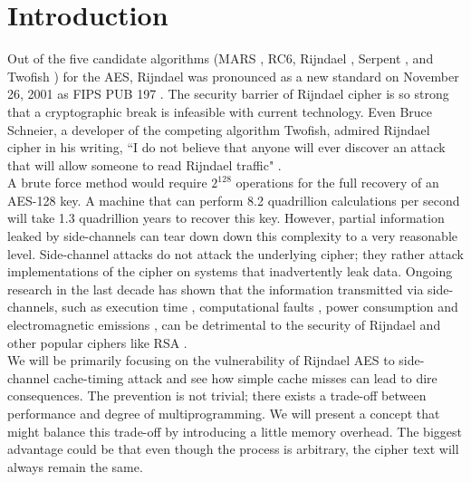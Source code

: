 \section{Introduction}

Out of the five candidate algorithms (MARS \cite{mars1998proposal}, RC6, Rijndael \cite{rijndael1998proposal}, Serpent \cite{serpent1998proposal}, and Twofish \cite{twofish1998proposal}) for the AES, Rijndael was pronounced as a new standard on November 26, 2001 as FIPS PUB 197 \cite{fips}. The security barrier of Rijndael cipher is so strong that a cryptographic break is infeasible with current technology. Even Bruce Schneier, a developer of the competing algorithm Twofish, admired Rijndael cipher in his writing, ``I do not believe that anyone will ever discover an attack that will allow someone to read Rijndael traffic" \cite{admire}.\\

A brute force method would require $2^{128}$ operations for the full recovery of an AES-128 key. A machine that can perform 8.2 quadrillion calculations per second will take 1.3 quadrillion years to recover this key. However, partial information leaked by side-channels can tear down down this complexity to a very reasonable level. Side-channel attacks do not attack the underlying cipher; they rather attack implementations of the cipher on systems that inadvertently leak data. Ongoing research in the last decade has shown that the information transmitted via side-channels, such as execution time \cite{spadavecchia2006network}, computational faults \cite{boneh}, power consumption \cite{kocher} and electromagnetic emissions \cite{em, em2, scards}, can be detrimental to the security of Rijndael \cite{daemen2002design} and other popular ciphers like RSA \cite{mit}.\\

We will be primarily focusing on the vulnerability of Rijndael AES to side-channel cache-timing attack and see how simple cache misses can lead to dire consequences. The prevention is not trivial; there exists a trade-off between performance and degree of multiprogramming. We will present a concept that might balance this trade-off by introducing a little memory overhead. The biggest advantage could be that even though the process is arbitrary, the cipher text will always remain the same.\\

